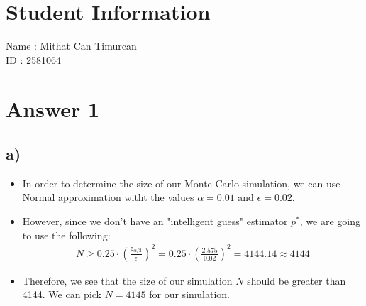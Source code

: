 \documentclass[12pt]{article}
\begin{document}
\section*{Student Information}

Name : Mithat Can Timurcan\\

ID : 2581064


\section*{Answer 1}
\subsection*{a)} 
\begin{itemize}
    \item In order to determine the size of our Monte Carlo simulation, we can use Normal approximation witht the values $\alpha = 0.01$ and $\epsilon = 0.02$.
    \item However, since we don't have an "intelligent guess" estimator $p^*$, we are going to use the following:
    \begin{equation*}
        \begin{split}
            N \geq 0.25 \cdot { \left(\frac{z_{\alpha/2} }{\epsilon}\right) }^2 = 0.25 \cdot { \left(\frac{2.575}{0.02}\right) }^2 = 4144.14 \approx 4144
        \end{split}
    \end{equation*}
    \item Therefore, we see that the size of our simulation $N$ should be greater than 4144. We can pick $N = 4145$ for our simulation.
\end{itemize}
\end{document}
